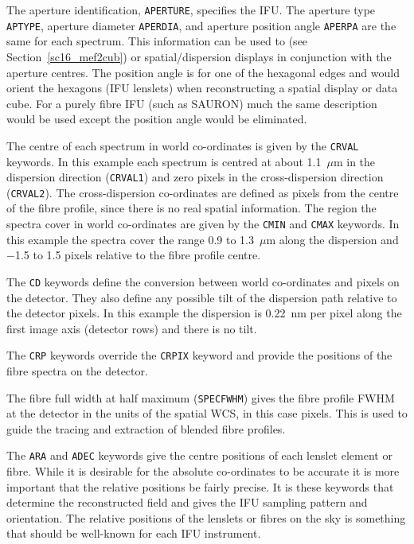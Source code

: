 \documentclass[twoside,11pt]{starlink}
\begin{document}
The aperture identification, \texttt{APERTURE}, specifies the IFU.  The
aperture type \texttt{APTYPE}, aperture diameter \texttt{APERDIA}, and
aperture position angle \texttt{APERPA} are the same for each spectrum.
This information can be used to  (see Section~\ref{sc16_mef2cub}) or
spatial/dispersion displays in conjunction with the aperture centres.
The position angle is for one of the hexagonal edges and would orient
the hexagons (IFU lenslets) when reconstructing a spatial display or
data cube.  For a purely fibre IFU (such as SAURON) much the same
description would be used except the position angle would be
eliminated.

The centre of each spectrum in world co-ordinates is given by the \texttt{CRVAL} keywords.  In this example each spectrum is centred at about
1.1~$\mu$m in the dispersion direction (\texttt{CRVAL1}) and zero pixels
in the cross-dispersion direction (\texttt{CRVAL2}).  The cross-dispersion
co-ordinates are defined as pixels from the centre of the fibre
profile, since there is no real spatial information.  The region the
spectra cover in world co-ordinates are given by the \texttt{CMIN} and
\texttt{CMAX} keywords.  In this example the spectra cover the range 0.9
to 1.3~$\mu$m along the dispersion and $-$1.5 to 1.5 pixels relative to
the fibre profile centre.

The \texttt{CD} keywords define the conversion between world co-ordinates
and pixels on the detector.  They also define any possible tilt of the
dispersion path relative to the detector pixels.  In this example the
dispersion is 0.22~nm per pixel along the first image axis (detector
rows) and there is no tilt.

The \texttt{CRP} keywords override the \texttt{CRPIX} keyword and provide
the positions of the fibre spectra on the detector.

The fibre full width at half maximum (\texttt{SPECFWHM}) gives the fibre
profile FWHM at the detector in the units of the spatial WCS, in this
case pixels.  This is used to guide the tracing and extraction of
blended fibre profiles.

The \texttt{ARA} and \texttt{ADEC} keywords give the centre positions of
each lenslet element or fibre.  While it is desirable for the absolute
co-ordinates to be accurate it is more important that the relative
positions be fairly precise.  It is these keywords that determine the
reconstructed field and gives the IFU sampling pattern and
orientation.  The relative positions of the lenslets or fibres on the
sky is something that should be well-known for each IFU instrument.
\end{document}
